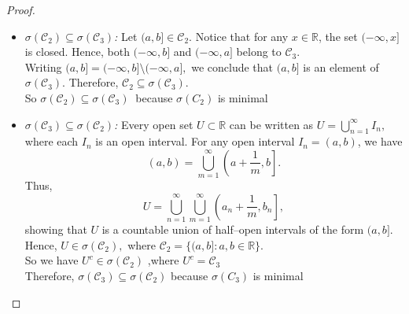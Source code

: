 \documentclass[letterpaper, 11pt]{article}
\newcommand{\1}{\mathds{1}}	%
\theoremstyle{definition}
\begin{document}
\begin{proof}
  \begin{itemize}
    \item \emph{\(\sigma( \mathcal{C}_2)\subseteq \sigma(\mathcal{C}_3)\):}  
    Let \((a,b] \in \mathcal{C}_2\). Notice that for any \(x\in\mathbb{R}\), the set \((-\infty,x]\) is closed. Hence, both \((-\infty,b]\) and \((-\infty,a]\) belong to \(\mathcal{C}_3\). 
    \\Writing
    $(a,b] = (-\infty,b] \setminus (-\infty,a],$
    we conclude that \((a,b]\) is an element of \(\sigma(\mathcal{C}_3)\). Therefore, 
    $\mathcal{C}_2 \subseteq \sigma(\mathcal{C}_3).$ 
    \\So $ \sigma( \mathcal{C}_2)\subseteq \sigma(\mathcal{C}_3)\ $ because $ \sigma(C_2) $ is minimal
    \item\emph{\( \sigma(\mathcal{C}_3) \subseteq \sigma(\mathcal{C}_2)\):}  
    Every open set \( U \subset \mathbb{R} \) can be written as
$
U = \bigcup_{n=1}^\infty I_n,
$
\\where each \( I_n \) is an open interval. For any open interval \( I_n = (a,b) \), we have
\[
(a,b) = \bigcup_{m=1}^\infty \left(a+\frac{1}{m}, b\right].
\]
Thus,
\[
U = \bigcup_{n=1}^\infty \bigcup_{m=1}^\infty \left(a_n+\frac{1}{m}, b_n\right],
\]
showing that \( U \) is a countable union of half–open intervals of the form \((a,b]\). \\Hence,
$
U \in \sigma(\mathcal{C}_2),
$
where 
$
\mathcal{C}_2 = \{ (a,b] : a,b \in \mathbb{R} \}.
$
\\So we have $ U^c\in \sigma(\mathcal{C}_2)$ ,where $ U^c= \mathcal{C}_3$ \\
Therefore, \( \sigma(\mathcal{C}_3) \subseteq \sigma(\mathcal{C}_2) \) because $ \sigma(C_3) $ is minimal

\end{itemize}
\end{proof}
\end{document}
